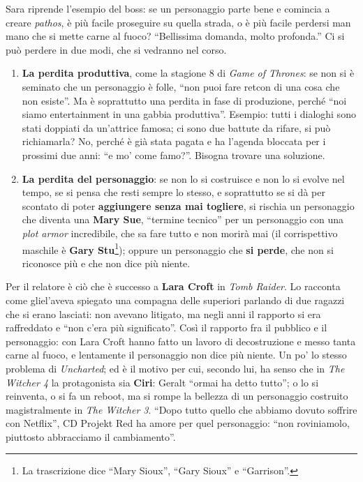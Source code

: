 Sara riprende l'esempio del boss: se un personaggio parte bene e comincia a
creare \emph{pathos}, è più facile proseguire su quella strada, o è più facile
perdersi man mano che si mette carne al fuoco? ``Bellissima domanda, molto
profonda.'' Ci si può perdere in due modi, che si vedranno nel corso.
\begin{enumerate}
  \item \textbf{La perdita produttiva}, come la stagione 8 di \emph{Game of
        Thrones}: se non si è seminato che un personaggio è folle, ``non puoi
        fare retcon di una cosa che non esiste''. Ma è soprattutto una perdita
        in fase di produzione, perché ``noi siamo entertainment in una gabbia
        produttiva''. Esempio: tutti i dialoghi sono stati doppiati da
        un'attrice famosa; ci sono due battute da rifare, si può richiamarla?
        No, perché è già stata pagata e ha l'agenda bloccata per i prossimi due
        anni: ``e mo' come famo?''. Bisogna trovare una soluzione.
  \item \textbf{La perdita del personaggio}: se non lo si costruisce e non lo
        si evolve nel tempo, se si pensa che resti sempre lo stesso, e
        soprattutto se si dà per scontato di poter \textbf{aggiungere senza mai
        togliere}, si rischia un personaggio che diventa una \textbf{Mary
        Sue}, ``termine tecnico'' per un personaggio con una \emph{plot armor}
        incredibile, che sa fare tutto e non morirà mai (il corrispettivo
        maschile è \textbf{Gary Stu}\footnote{La trascrizione dice ``Mary
        Sioux'', ``Gary Sioux'' e ``Garrison''.}); oppure un personaggio che
        \textbf{si perde}, che non si riconosce più e che non dice più niente.
\end{enumerate}
Per il relatore è ciò che è successo a \textbf{Lara Croft} in \emph{Tomb
Raider}. Lo racconta come gliel'aveva spiegato una compagna delle superiori
parlando di due ragazzi che si erano lasciati: non avevano litigato, ma negli
anni il rapporto si era raffreddato e ``non c'era più significato''. Così il
rapporto fra il pubblico e il personaggio: con Lara Croft hanno fatto un lavoro
di decostruzione e messo tanta carne al fuoco, e lentamente il personaggio non
dice più niente. Un po' lo stesso problema di \emph{Uncharted}; ed è il motivo
per cui, secondo lui, ha senso che in \emph{The Witcher 4} la protagonista sia
\textbf{Ciri}: Geralt ``ormai ha detto tutto''; o lo si reinventa, o si fa un
reboot, ma si rompe la bellezza di un personaggio costruito magistralmente in
\emph{The Witcher 3}. ``Dopo tutto quello che abbiamo dovuto soffrire con
Netflix'', CD Projekt Red ha amore per quel personaggio: ``non roviniamolo,
piuttosto abbracciamo il cambiamento''.


